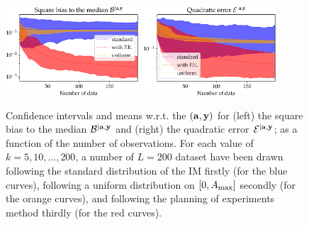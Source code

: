 




\begin{figure}[h!]
    \centering%
    \includegraphics[width=5cm]{figures/low-doe/errB.pdf}%
    \includegraphics[width=5cm]{figures/low-doe/errE.pdf}%
    \caption{Confidence intervals and means w.r.t.{ }the 
    $(\mathbf{a},\mathbf{y})$ for (left) the square bias to the median $\mathcal{B}^{|\mathbf{a},\mathbf{y}}$ and (right) the quadratic error $\mathcal{E}^{|\mathbf{a},\mathbf{y}}$; as a function of the number of observations. For each value of $k=5,10,\dots,200$, a number of $L=200$ dataset have been drawn following the standard distribution of the IM firstly (for the blue curves), {following a uniform distribution on $[0,A_{\rm max}]$ secondly (for the orange curves)}, and following the planning of experiments method thirdly (for the red curves). }
    \label{lowdoe:fig:errors}
\end{figure}


